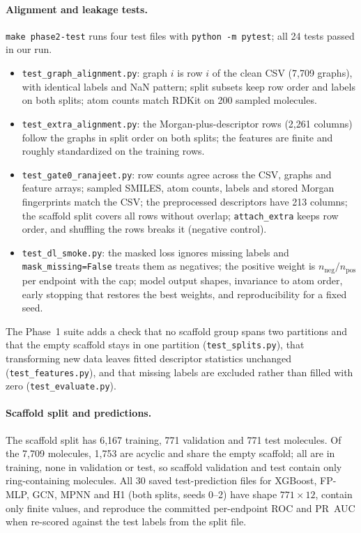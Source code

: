 \paragraph{Alignment and leakage tests.}
\texttt{make phase2-test} runs four test files with \texttt{python -m pytest}; all 24 tests passed in our run.
\begin{itemize}
    \item \texttt{test\_graph\_alignment.py}: graph $i$ is row $i$ of the clean CSV (7,709 graphs), with identical labels and NaN pattern; split subsets keep row order and labels on both splits; atom counts match RDKit on 200 sampled molecules.
    \item \texttt{test\_extra\_alignment.py}: the Morgan-plus-descriptor rows (2,261 columns) follow the graphs in split order on both splits; the features are finite and roughly standardized on the training rows.
    \item \texttt{test\_gate0\_ranajeet.py}: row counts agree across the CSV, graphs and feature arrays; sampled SMILES, atom counts, labels and stored Morgan fingerprints match the CSV; the preprocessed descriptors have 213 columns; the scaffold split covers all rows without overlap; \texttt{attach\_extra} keeps row order, and shuffling the rows breaks it (negative control).
    \item \texttt{test\_dl\_smoke.py}: the masked loss ignores missing labels and \texttt{mask\_missing=False} treats them as negatives; the positive weight is $n_{\text{neg}}/n_{\text{pos}}$ per endpoint with the cap; model output shapes, invariance to atom order, early stopping that restores the best weights, and reproducibility for a fixed seed.
\end{itemize}
The Phase~1 suite adds a check that no scaffold group spans two partitions and that the empty scaffold stays in one partition (\texttt{test\_splits.py}), that transforming new data leaves fitted descriptor statistics unchanged (\texttt{test\_features.py}), and that missing labels are excluded rather than filled with zero (\texttt{test\_evaluate.py}).

\paragraph{Scaffold split and predictions.}
The scaffold split has 6,167 training, 771 validation and 771 test molecules. Of the 7,709 molecules, 1,753 are acyclic and share the empty scaffold; all are in training, none in validation or test, so scaffold validation and test contain only ring-containing molecules. All 30 saved test-prediction files for XGBoost, FP-MLP, GCN, MPNN and H1 (both splits, seeds 0--2) have shape $771 \times 12$, contain only finite values, and reproduce the committed per-endpoint ROC and PR~AUC when re-scored against the test labels from the split file.

